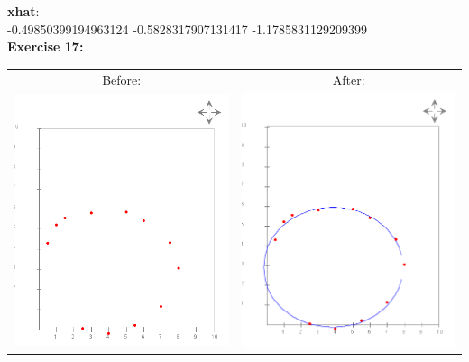 \documentclass[10pt]{article}
\begin{document}
	\textbf{xhat}:\\
	-0.49850399194963124 -0.5828317907131417 -1.1785831129209399
	\\
	
	\textbf{\large Exercise 17:}\\
	\begin{tabular}{cc}
		Before: & After:\\
		\includegraphics[scale=.5]{module7_exercise17} & \includegraphics[scale=.5]{module7_exercise17_b}
	\end{tabular}
	
\end{document}
